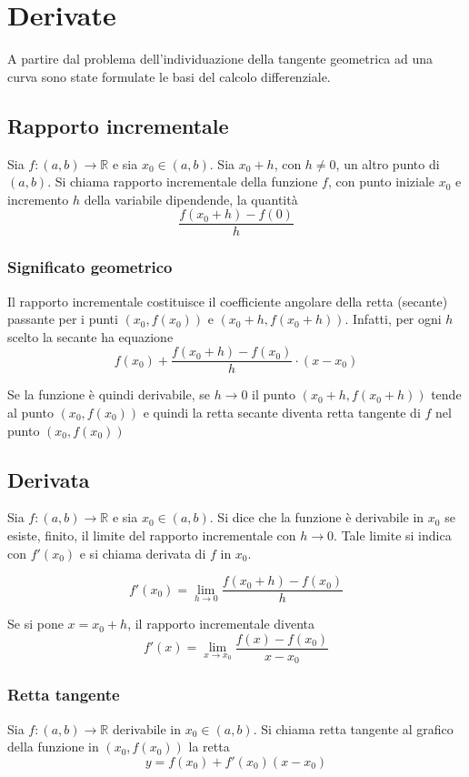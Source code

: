 \chapter{Derivate}

A partire dal problema dell'individuazione della tangente geometrica ad una curva sono state formulate le basi del calcolo differenziale.

\section{Rapporto incrementale}

Sia $f: (a,b) \to \mathbb{R}$ e sia $x_0 \in (a,b)$. Sia $x_0 + h$, con $h \neq 0$, un altro punto di $(a,b)$. Si chiama rapporto incrementale della funzione $f$, con punto iniziale $x_0$ e incremento $h$ della variabile dipendende, la quantità $$\frac{f(x_0+h)-f(0)}{h}$$

\subsection{Significato geometrico}
Il rapporto incrementale costituisce il coefficiente angolare della retta (secante) passante per i punti $(x_0,f(x_0))$ e $(x_0+h,f(x_0+h))$. Infatti, per ogni $h$ scelto la secante ha equazione $$f(x_0) + \frac{f(x_0+h)-f(x_0)}{h}\cdot (x-x_0)$$

Se la funzione è quindi derivabile, se $h \to 0$ il punto $(x_0+h,f(x_0+h))$ tende al punto $(x_0,f(x_0))$ e quindi la retta secante diventa retta tangente di $f$ nel punto $(x_0,f(x_0))$

\section{Derivata}
Sia $f: (a,b) \to \mathbb{R}$ e sia $x_0 \in (a,b)$. Si dice che la funzione è derivabile in $x_0$ se esiste, finito,  il limite del rapporto incrementale con $h \to 0$. Tale limite si indica con $f'(x_0)$ e si chiama derivata di $f$ in $x_0$.

$$f'(x_0)=\lim_{h\to 0} \frac{f(x_0+h)-f(x_0)}{h}$$

Se si pone $x=x_0+h$, il rapporto incrementale diventa 
$$f'(x)=\lim_{x\to x_0} \frac{f(x)-f(x_0)}{x-x_0}$$


\subsection{Retta tangente}

Sia $f:(a,b)\to\mathbb{R}$ derivabile in $x_0 \in (a,b)$. Si chiama retta tangente al grafico della funzione in $(x_0,f(x_0))$ la retta $$y = f(x_0) + f'(x_0)(x-x_0)$$

